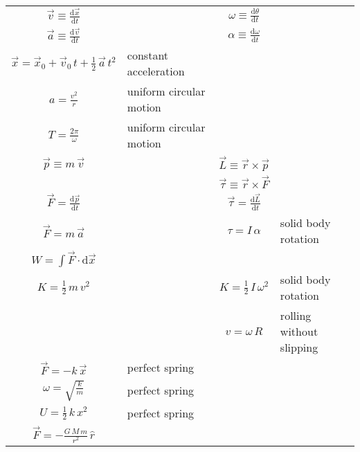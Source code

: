 \documentclass[letterpaper,12pt]{article}
\begin{document}
\begin{tabular}{cl|cl}
$\displaystyle \vec{v}\equiv\frac{\mathrm{d}\vec{x}}{\mathrm{d}t}$       & &
$\displaystyle \omega\equiv\frac{\mathrm{d}\theta}{\mathrm{d}t}$         \\[3ex]
$\displaystyle \vec{a}\equiv\frac{\mathrm{d}\vec{v}}{\mathrm{d}t}$       & &
$\displaystyle \alpha\equiv\frac{\mathrm{d}\omega}{\mathrm{d}t}$         \\[3ex]
$\displaystyle \vec{x}=\vec{x}_0+\vec{v}_0\,t+\frac{1}{2}\,\vec{a}\,t^2$
                                                 & constant acceleration & &
                                                                         \\[3ex]
$\displaystyle a=\frac{v^2}{r}$ & uniform circular motion                & &
                                                                         \\[3ex]
$\displaystyle T=\frac{2\pi}{\omega}$ & uniform circular motion          & &
                                                                         \\[3ex]
$\displaystyle \vec{p}\equiv m\,\vec{v}$                                 & &
$\displaystyle \vec{L}\equiv\vec{r}\times\vec{p}$                        \\[3ex]
                                                                         & &
$\displaystyle \vec{\tau}\equiv\vec{r}\times\vec{F}$                     \\[3ex]
$\displaystyle \vec{F}=\frac{\mathrm{d}\vec{p}}{\mathrm{d}t}$            & &
$\displaystyle \vec{\tau}=\frac{\mathrm{d}\vec{L}}{\mathrm{d}t}$         \\[3ex]
$\displaystyle \vec{F}=m\,\vec{a}$                                       & &
$\displaystyle \tau=I\,\alpha$ & solid body rotation                     \\[3ex]
$\displaystyle W=\int\vec{F}\cdot\mathrm{d}\vec{x}$                      & &
                                                                         \\[3ex]
$\displaystyle K=\frac{1}{2}\,m\,v^2$                                    & &
$\displaystyle K=\frac{1}{2}\,I\,\omega^2$ & solid body rotation         \\[3ex]
                                                                         & &
$\displaystyle v=\omega\,R$ & rolling without slipping                   \\[3ex]
$\displaystyle \vec{F}=-k\,\vec{x}$ & perfect spring                     & &
                                                                         \\[3ex]
$\displaystyle \omega=\sqrt{\frac{k}{m}}$ & perfect spring               & &
                                                                         \\[3ex]
$\displaystyle U=\frac{1}{2}\,k\,x^2$ & perfect spring                   & &
                                                                         \\[3ex]
$\displaystyle \vec{F}=-\frac{G\,M\,m}{r^2}\,\hat{r}$                    & &
                                                                         \\[3ex]
\end{tabular}
\end{document}
